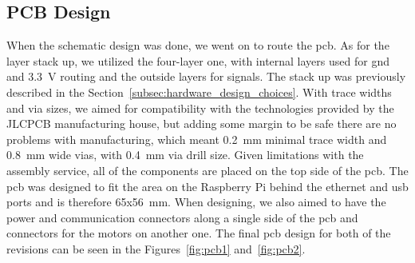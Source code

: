 \subsection{PCB Design}
\label{subsec:pcb_design}
When the schematic design was done, we went on to route the \acs{pcb}.
As for the layer stack up, we utilized the four-layer one, with internal layers used for \acs{gnd} and 3.3~V routing and the outside layers for signals.
The stack up was previously described in the Section~\ref{subsec:hardware_design_choices}.
With trace widths and via sizes, we aimed for compatibility with the technologies provided by the JLCPCB manufacturing house, but adding some margin to be safe there are no problems with manufacturing, which meant 0.2~mm minimal trace width and 0.8~mm wide vias, with 0.4~mm via drill size.
Given limitations with the assembly service, all of the components are placed on the top side of the \acs{pcb}.
The \acs{pcb} was designed to fit the area on the Raspberry Pi behind the ethernet and \acs{usb} ports and is therefore 65x56~mm.
When designing, we also aimed to have the power and communication connectors along a single side of the \acs{pcb} and connectors for the motors on another one.
The final \acs{pcb} design for both of the revisions can be seen in the Figures~\ref{fig:pcb1} and~\ref{fig:pcb2}.

